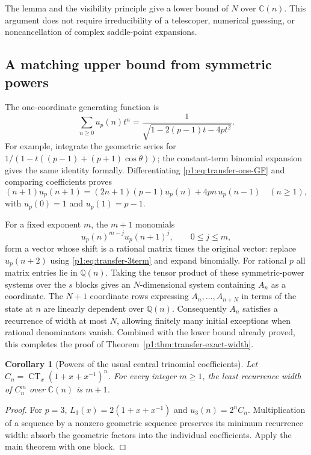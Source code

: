 \documentclass[11pt,a4paper]{article}
\newtheorem{corollary}[theorem]{Corollary}
\theoremstyle{definition}
\theoremstyle{remark}
\numberwithin{equation}{section}
\begin{document}
The lemma and the visibility principle give a lower bound of $N$ over
$\mathbb C(n)$.  This argument does not require irreducibility of a
telescoper, numerical guessing, or noncancellation of complex saddle-point
expansions.

\subsection{A matching upper bound from symmetric powers}

The one-coordinate generating function is
\begin{equation}\label{p1:eq:transfer-one-GF}
 \sum_{n\geq0}u_p(n)t^n
 =\frac1{\sqrt{1-2(p-1)t-4pt^2}}.
\end{equation}
For example, integrate the geometric series for
$1/(1-t((p-1)+(p+1)\cos\theta))$; the constant-term binomial expansion
gives the same identity formally.  Differentiating
\eqref{p1:eq:transfer-one-GF} and comparing coefficients proves
\begin{equation}\label{p1:eq:transfer-3term}
 (n+1)u_p(n+1)=(2n+1)(p-1)u_p(n)+4pn\,u_p(n-1)
 \quad(n\geq1),
\end{equation}
with $u_p(0)=1$ and $u_p(1)=p-1$.

For a fixed exponent $m$, the $m+1$ monomials
\[
 u_p(n)^{m-j}u_p(n+1)^j,\qquad 0\leq j\leq m,
\]
form a vector whose shift is a rational matrix times the original vector:
replace $u_p(n+2)$ using \eqref{p1:eq:transfer-3term} and expand binomially.
For rational $p$ all matrix entries lie in $\mathbb Q(n)$.
Taking the tensor product of these symmetric-power systems over the
$s$ blocks gives an $N$-dimensional system containing $A_n$ as a coordinate.
The $N+1$ coordinate rows expressing $A_n,\ldots,A_{n+N}$ in terms of
the state at $n$ are linearly dependent over $\mathbb Q(n)$.  Consequently
$A_n$ satisfies a recurrence of width at most $N$, allowing finitely many
initial exceptions when rational denominators vanish.  Combined with the
lower bound already proved, this completes the proof of
Theorem~\ref{p1:thm:transfer-exact-width}.

\begin{corollary}[Powers of the usual central trinomial coefficients]
\label{p1:cor:transfer-trinomial-power}
Let $C_n=\operatorname{CT}_x(1+x+x^{-1})^n$.  For every integer $m\geq1$,
the least recurrence width of $C_n^m$ over $\mathbb C(n)$ is $m+1$.
\end{corollary}
\begin{proof}
For $p=3$, $L_3(x)=2(1+x+x^{-1})$ and $u_3(n)=2^nC_n$.
Multiplication of a sequence by a nonzero geometric sequence preserves
its minimum recurrence width: absorb the geometric factors into the
individual coefficients.  Apply the main theorem with one block.
\end{proof}
\end{document}
